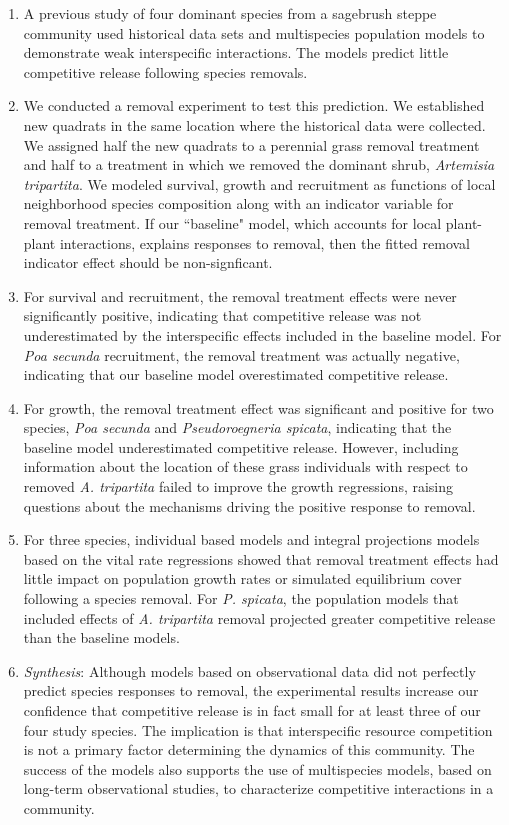 \documentclass[11pt]{article}
\begin{document}
\begin{doublespacing}
\begin{enumerate}
\item A previous study of four dominant species from a sagebrush steppe community used historical data sets and multispecies population models to demonstrate weak interspecific interactions. The models predict little competitive release following species removals.
\item We conducted a removal experiment to test this prediction. We established new quadrats in the same location where the historical data were collected. We assigned half the new quadrats to a  perennial grass removal treatment and half to a treatment in which we removed the dominant shrub, \textit{Artemisia tripartita}. We modeled survival, growth and recruitment as functions of local neighborhood species composition along with an indicator variable for removal treatment. If our ``baseline" model, which accounts for local plant-plant interactions, explains responses to removal, then the fitted removal indicator effect should be non-signficant.
\item  For survival and recruitment, the removal treatment effects were never significantly positive, indicating that competitive release was not underestimated by the interspecific effects included in the baseline model. For  \textit{Poa secunda} recruitment, the removal treatment was actually negative, indicating that our baseline model overestimated competitive release.
\item For growth, the removal treatment effect was significant and positive for two species, \textit{Poa secunda} and \textit{Pseudoroegneria spicata}, indicating that the baseline model underestimated competitive release. However, including information about the location of these grass individuals with respect to removed \textit{A. tripartita} failed to improve the growth regressions, raising questions about the mechanisms driving the positive response to removal.
\item For three species, individual based models and integral projections models based on the vital rate regressions showed that removal treatment effects had little impact on population growth rates or simulated equilibrium cover following a species removal. For \textit{P. spicata}, the population models that included effects of \textit{A. tripartita} removal projected greater competitive release than the baseline models. 
\item \emph{Synthesis}: Although models based on observational data did not perfectly predict species responses to removal, the experimental results increase our confidence that competitive release is in fact small for at least three of our four study species. The implication is that interspecific resource competition is not a primary factor determining the dynamics of this community. The success of the models also supports the use of multispecies models, based on long-term observational studies, to characterize competitive interactions in a community. 


\end{enumerate}
\end{doublespacing}
\end{document}
